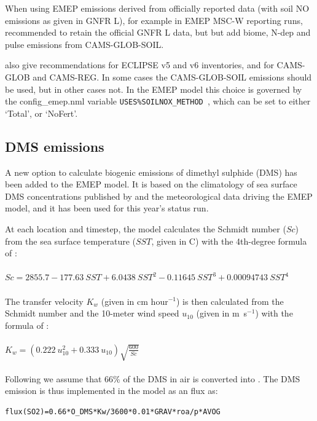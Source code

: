 When using EMEP emissions derived from
officially reported data (with soil NO emissions as given in GNFR L),
for example in EMEP MSC-W reporting runs,
\citet{SimpsonDarras:2021} recommended to retain the
official GNFR L data, but but add biome, N-dep and pulse emissions from CAMS-GLOB-SOIL.

\citet{SimpsonDarras:2021} also give recommendations for
ECLIPSE v5 and v6 inventories, and for CAMS-GLOB and CAMS-REG. In
some cases the CAMS-GLOB-SOIL \Nfert emissions should be used, but
in other cases not. In the EMEP model this choice is governed
by the config\_emep.nml variable \verb|USES%SOILNOX_METHOD |, which can
be set to either `Total', or `NoFert'.



\subsection{DMS emissions}
\label{ssec:DMS}

A new option to calculate biogenic emissions of dimethyl sulphide (DMS) has been added to the EMEP model. It is based on the climatology of sea surface DMS concentrations published by \citet{Lana2011} and the meteorological data driving the EMEP model, and it has been used for this year's status run. 

At each location and timestep, the model calculates the Schmidt number ($Sc$) from the sea surface temperature ($SST$, given in \textdegree C) with the 4th-degree formula of \citet{Wanninkhof2014}:
\\
\\
$Sc=2855.7 -177.63\  SST + 6.0438\  SST^2 - 0.11645\  SST^3 + 0.00094743\ SST^4$ 
\\
\\
The transfer velocity $K_{w}$ (given in cm hour$^{-1}$) is then calculated  from the Schmidt number and the 10-meter wind speed $u_{10}$ (given in m~s$^{-1}$) with the formula of \citet{Nightingale2000}:
\\
\\
$K_w=(0.222\  u_{10}^2 +0.333\ u_{10}) \sqrt{\frac{600}{Sc}} $
\\
\\
Following \citet{Leonor:DMS2} we assume that 66\% of the DMS in air is converted into . The DMS emission is thus implemented in the model as an  flux as:

\begin{verbatim}
flux(SO2)=0.66*O_DMS*Kw/3600*0.01*GRAV*roa/p*AVOG  
\end{verbatim}


